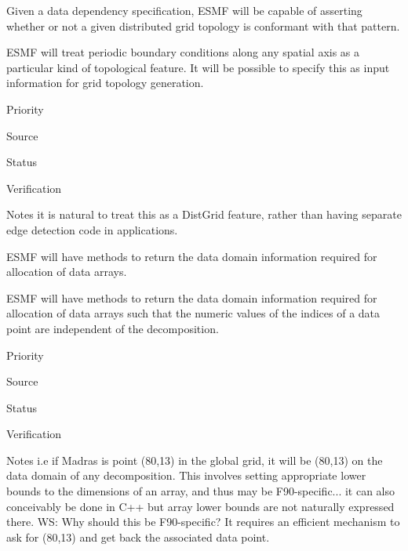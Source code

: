 
Given a data dependency specification, ESMF will be capable of
asserting whether or not a given distributed grid topology is
conformant with that pattern.


ESMF will treat periodic boundary conditions along any spatial axis as
a particular kind of topological feature. It will be possible to
specify this as input information for grid topology generation.

\begin{reqlist}
\item[Priority]
\item[Source]
\item[Status]
\item[Verification]
\item[Notes] it is natural to treat this as a DistGrid feature, rather
  than having separate edge detection code in applications.
\end{reqlist}


ESMF will have methods to return the data domain information required
for allocation of data arrays.


ESMF will have methods to return the data domain information required
for allocation of data arrays such that the numeric values of the
indices of a data point are independent of the decomposition.

\begin{reqlist}
\item[Priority]
\item[Source]
\item[Status]
\item[Verification]
\item[Notes] i.e if Madras is point (80,13) in the global grid, it
  will be (80,13) on the data domain of any decomposition. This
  involves setting appropriate lower bounds to the dimensions of an
  array, and thus may be F90-specific... it can also conceivably be
  done in C++ but array lower bounds are not naturally expressed
  there.  WS: Why should this be F90-specific?  
  It requires an efficient mechanism to ask for (80,13) and get 
  back the associated data point.
\end{reqlist}


